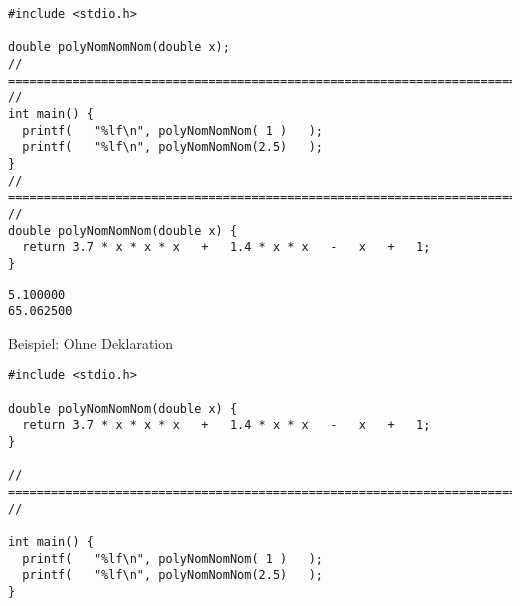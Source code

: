 
\begin{frame}[fragile]
%
\begin{codebox}
\begin{verbatim}
#include <stdio.h>

double polyNomNomNom(double x);
// ========================================================================= //
int main() {
  printf(   "%lf\n", polyNomNomNom( 1 )   );
  printf(   "%lf\n", polyNomNomNom(2.5)   );
}
// ========================================================================= //
double polyNomNomNom(double x) {
  return 3.7 * x * x * x   +   1.4 * x * x   -   x   +   1;
}
\end{verbatim}
\end{codebox}
%
\begin{cmdbox}[Ausgabe]
\begin{verbatim}
5.100000
65.062500
\end{verbatim}
\end{cmdbox}
%
\end{frame}


\begin{frame}[fragile]{Beispiel: Ohne Deklaration}
%
\begin{codebox}
\begin{verbatim}
#include <stdio.h>

double polyNomNomNom(double x) {
  return 3.7 * x * x * x   +   1.4 * x * x   -   x   +   1;
}

// ========================================================================= //

int main() {
  printf(   "%lf\n", polyNomNomNom( 1 )   );
  printf(   "%lf\n", polyNomNomNom(2.5)   );
}
\end{verbatim}
\end{codebox}
%
\end{frame}


